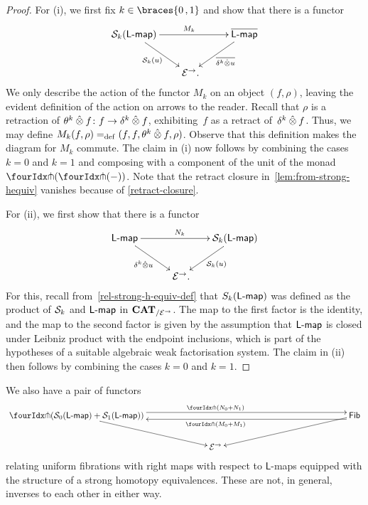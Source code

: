 \documentclass[reqno,10pt,a4paper,oneside,draft]{amsart}
\newcommand{\LL}{\mathsf{L}}
\begin{document}
{{\begin{proof} For (i), we first fix $k \in \braces{0 \, , 1 }$ and show that there is a functor
\begin{equation}
\label{lem:from-strong-hequiv}
\begin{gathered}
\xymatrix@!C@C-2em{
  \cal{S}_k(\pcoalg{\LL})
  \ar[dr]_{\cal{S}_k(u)}
  \ar[rr]^{M_k}
&&
  \overline{\pcoalg{\LL}}
  \ar[dl]^-{\overline{\kcyl \hatotimes u}}
\\&
  \catE^\to
\rlap{.}}
\end{gathered}
\end{equation}
We only describe the action of the functor $M_k$ on an object $(f, \rho)$, leaving the evident definition of the action on arrows to the reader.
Recall that $\rho$ is a retraction of $\thetak \hatotimes f \co f \to \kcyl \hatotimes f$, exhibiting~$f$ as a retract of~$\kcyl \hatotimes f$.
Thus, we may define $M_k(f, \rho) \defeq (f, f, \thetak \hatotimes f, \rho)$.
Observe that this definition makes the diagram for $M_k$ commute. The claim in (i) now follows by combining 
the cases $k = 0$ and $k = 1$ and composing with a component of the unit of the monad $\liftl{(\liftr{(-)})}$.
Note that the retract closure in~\eqref{lem:from-strong-hequiv} vanishes because of \cref{retract-closure}.


For (ii), we first show that there is a functor
\[
\xymatrix@!C@C-2em{
  \pcoalg{\LL}
  \ar[dr]_{\kcyl \hatotimes u} \ar[rr]^{N_k}
&&
  \cal{S}_k(\pcoalg{\LL})
  \ar[dl]^{\cal{S}_k(u)}
\\&
   \catE^\to
\rlap{.}}
\]
For this, recall from~\eqref{rel-strong-h-equiv-def} that $S_k(\pcoalg{\LL})$ was defined as the product of $\cal{S}_k$ and $\pcoalg{\LL}$  
in $\CAT_{/\cal{E}^\to}$. The map to the first factor is the identity, and the map to the second factor is given by the assumption that $\pcoalg{\LL}$ is closed under Leibniz product with the endpoint inclusions, which is part of the hypotheses of a suitable algebraic weak factorisation system.
The claim in (ii) then follows by combining the cases $k = 0$ and $k = 1$.
\end{proof}



\begin{remark} \label{relating-strong-hequiv-and-uniform-fib}
We also have a pair of functors
\[
\xymatrix@!C@C-2.5em{
  \liftr{(\cal{S}_0(\pcoalg{\LL}) + \cal{S}_1(\pcoalg{\LL}))}
  \ar[dr]
  \ar@<4pt>[rr]^{\liftr{(N_0 + N_1)}}
&&
   \Fib
  \ar[dl]
  \ar@<4pt>[ll]^{\liftr{(M_0 + M_1)}}
\\&
  \catE^\to
}
\]
relating uniform fibrations with right maps with respect to $\LL$-maps equipped with the structure of 
a strong homotopy equivalences. These are not, in general, inverses to each other in either way.
\end{remark}

}}
\end{document}
